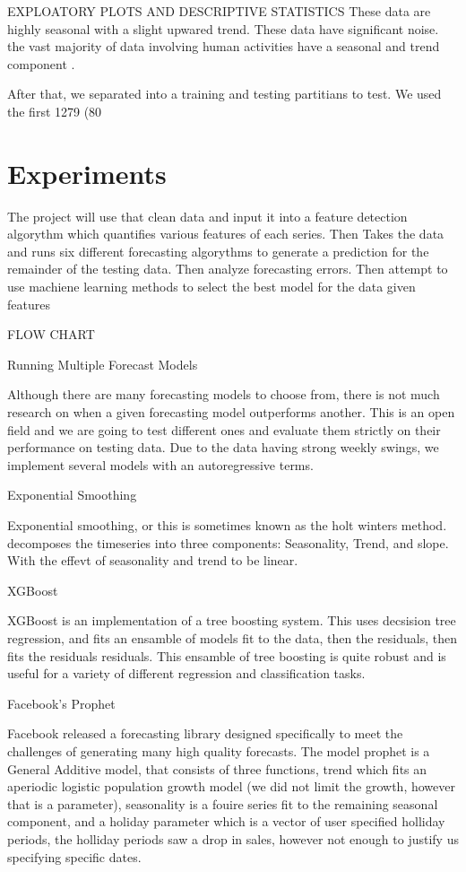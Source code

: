 \documentclass[12pt,twocolumn,letterpaper]{article}
\begin{document}
EXPLOATORY PLOTS AND DESCRIPTIVE STATISTICS
These data are highly seasonal with a slight upwared trend. These data have significant noise. the vast majority of data involving human activities have a seasonal and trend component \cite{taylor2018forecasting}. 

After that, we separated into a training and testing partitians to test. We used the first 1279 (80%

\section{Experiments}

The project will use that clean data and input it into a feature detection algorythm which quantifies various features of each series. Then Takes the data and runs six different forecasting algorythms to generate a prediction for the remainder of the testing data. Then analyze forecasting errors. Then attempt to use machiene learning methods to select the best model for the data given features

FLOW CHART

Running Multiple Forecast Models

Although there are many forecasting models to choose from, there is not much research on when a given forecasting model outperforms another. This is an open field and we are going to test different ones and evaluate them strictly on their performance on testing data. Due to the data having strong weekly swings, we implement several models with an autoregressive terms.

 Exponential Smoothing

Exponential smoothing, or this is sometimes known as the holt winters method. decomposes the timeseries into three components: Seasonality, Trend, and slope. With the effevt of seasonality and trend to be linear.

XGBoost

XGBoost is an implementation of a tree boosting system. This uses decsision tree regression, and fits an ensamble of models fit to the data, then the residuals, then fits the residuals residuals. This ensamble of tree boosting is quite robust and is useful for a variety of different regression and classification tasks.

Facebook's Prophet

Facebook released a forecasting library designed specifically to meet the challenges of generating many high quality forecasts. The model prophet is a General Additive model, that consists of three functions, trend which fits an aperiodic logistic population growth model (we did not limit the growth, however that is a parameter), seasonality is a fouire series fit to the remaining seasonal component, and a holiday parameter which is a vector of user specified holliday periods, the holliday periods saw a drop in sales, however not enough to justify us specifying specific dates. 
\end{document}
